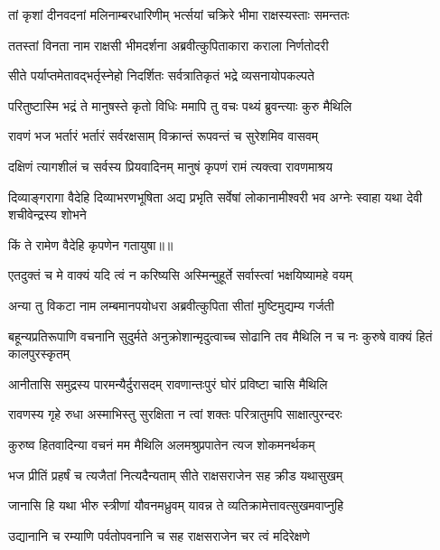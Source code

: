 \twolineshloka
{तां कृशां दीनवदनां मलिनाम्बरधारिणीम्}
{भर्त्सयां चक्रिरे भीमा राक्षस्यस्ताः समन्ततः} %

\twolineshloka
{ततस्तां विनता नाम राक्षसी भीमदर्शना}
{अब्रवीत्कुपिताकारा कराला निर्णतोदरी} %

\twolineshloka
{सीते पर्याप्तमेतावद्भर्तृस्नेहो निदर्शितः}
{सर्वत्रातिकृतं भद्रे व्यसनायोपकल्पते} %

\twolineshloka
{परितुष्टास्मि भद्रं ते मानुषस्ते कृतो विधिः}
{ममापि तु वचः पथ्यं ब्रुवन्त्याः कुरु मैथिलि} %

\twolineshloka
{रावणं भज भर्तारं भर्तारं सर्वरक्षसाम्}
{विक्रान्तं रूपवन्तं च सुरेशमिव वासवम्} %

\twolineshloka
{दक्षिणं त्यागशीलं च सर्वस्य प्रियवादिनम्}
{मानुषं कृपणं रामं त्यक्त्वा रावणमाश्रय} %

\threelineshloka
{दिव्याङ्गरागा वैदेहि दिव्याभरणभूषिता}
{अद्य प्रभृति सर्वेषां लोकानामीश्वरी भव}
{अग्नेः स्वाहा यथा देवी शचीवेन्द्रस्य शोभने} %

{किं ते रामेण वैदेहि कृपणेन गतायुषा॥॥} %

\addtocounter{shlokacount}{1}

\twolineshloka
{एतदुक्तं च मे वाक्यं यदि त्वं न करिष्यसि}
{अस्मिन्मुहूर्ते सर्वास्त्वां भक्षयिष्यामहे वयम्} %

\twolineshloka
{अन्या तु विकटा नाम लम्बमानपयोधरा}
{अब्रवीत्कुपिता सीतां मुष्टिमुद्यम्य गर्जती} %

\threelineshloka
{बहून्यप्रतिरूपाणि वचनानि सुदुर्मते}
{अनुक्रोशान्मृदुत्वाच्च सोढानि तव मैथिलि}
{न च नः कुरुषे वाक्यं हितं कालपुरस्कृतम्} %

\twolineshloka
{आनीतासि समुद्रस्य पारमन्यैर्दुरासदम्}
{रावणान्तःपुरं घोरं प्रविष्टा चासि मैथिलि} %

\twolineshloka
{रावणस्य गृहे रुधा अस्माभिस्तु सुरक्षिता}
{न त्वां शक्तः परित्रातुमपि साक्षात्पुरन्दरः} %

\twolineshloka
{कुरुष्व हितवादिन्या वचनं मम मैथिलि}
{अलमश्रुप्रपातेन त्यज शोकमनर्थकम्} %

\twolineshloka
{भज प्रीतिं प्रहर्षं च त्यजैतां नित्यदैन्यताम्}
{सीते राक्षसराजेन सह क्रीड यथासुखम्} %

\twolineshloka
{जानासि हि यथा भीरु स्त्रीणां यौवनमध्रुवम्}
{यावन्न ते व्यतिक्रामेत्तावत्सुखमवाप्नुहि} %

\twolineshloka
{उद्यानानि च रम्याणि पर्वतोपवनानि च}
{सह राक्षसराजेन चर त्वं मदिरेक्षणे} %

